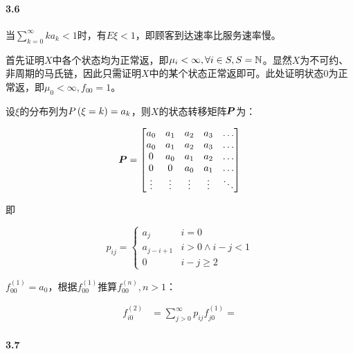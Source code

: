 \documentclass{../notes}
\begin{document}
    \paragraph*{3.6} 当$\sum_{k=0}^\infty ka_k < 1$时，有$E\xi < 1$，即顾客到达速率比服务速率慢。

    首先证明$X$中各个状态均为正常返，即$\mu_i < \infty, \forall i\in S, S = \mathbb N$。显然$X$为不可约、非周期的马氏链，因此只需证明$X$中的某个状态正常返即可。此处证明状态$0$为正常返，即$\mu_0 < \infty, f_{00} = 1$。

    设$\xi$的分布列为$P\left(\xi = k\right) = a_k$，则$X$的状态转移矩阵$\boldsymbol P$为：

    \begin{equation}
        \boldsymbol P = \begin{bmatrix}
            a_0 & a_1 & a_2 & a_3 & \dots \\
            a_0 & a_1 & a_2 & a_3 & \dots \\
            0 & a_0 & a_1 & a_2 & \dots \\
            0 & 0 & a_0 & a_1 & \dots \\
            \vdots & \vdots & \vdots & \vdots & \ddots
        \end{bmatrix}
    \end{equation}

    即

    \begin{equation}
        p_{ij} = \begin{cases}
            a_{j} & i = 0 \\
            a_{j-i+1} & i > 0\land i - j < 1 \\
            0 & i - j \geq 2
        \end{cases}
    \end{equation}

    $f_{00}^{(1)} = a_0$，根据$f_{00}^{(1)}$推算$f_{00}^{(n)}, n > 1$：

    \begin{equation}
        \begin{aligned}
            f_{i0}^{(2)} &= \sum_{j>0}^{\infty} p_{ij}f_{j0}^{(1)} = 
        \end{aligned}
    \end{equation}

    \paragraph*{3.7}
\end{document}
